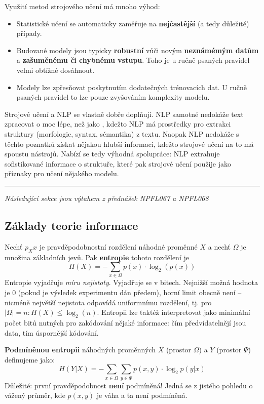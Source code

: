 \documentclass[11pt]{report} %
\numberwithin{equation}{section}
\begin{document}
Využití metod strojového učení má mnoho výhod:
\begin{itemize}
	
	
	\item Statistické učení se automaticky zaměřuje na \textbf{nejčastější} (a tedy důležité) případy.
	\item Budované modely jsou typicky \textbf{robustní} vůči novým \textbf{neznámémým datům} a \textbf{zašuměnému či chybnému vstupu}. Toho je u ručně psaných pravidel velmi obtížné dosáhnout.
	\item Modely lze zpřesňovat poskytnutím dodatečných trénovacích dat. U ručně psaných pravidel to lze pouze zvyšováním komplexity modelu.
\end{itemize}

Strojové učení a NLP se vlastně dobře doplňují. NLP samotné nedokáže text zpracovat o moc lépe, než jako , kdežto NLP má prostředky pro extrakci struktury (morfologie, syntax, sémantika) z textu. Naopak NLP nedokáže s těchto poznatků získat nějakou hlubší informaci, kdežto strojové učení na to má spoustu nástrojů. Nabízí se tedy výhodná spolupráce: NLP extrahuje sofistikované informace o struktuře, které pak strojové učení použije jako příznaky pro učení nějakého modelu.

\hrule
\medskip
\textit{Následující sekce jsou výtahem z přednášek NPFL067 a NPFL068}
\subsection{Základy teorie informace}
Nechť $p_X{x}$ je pravděpodobnostní rozdělení náhodné proměnné $X$ a nechť $\Omega$ je množina základních jevů. Pak \textbf{entropie} tohoto rozdělení je 
$$H(X) = -\sum\limits_{x \in \Omega} p(x) \cdot \log_2(p(x))$$
Entropie vyjadřuje \textit{míru nejistoty}. Vyjadřuje se v bitech. Nejnižší možná hodnota je 0 (pokud je výsledek experimentu dán předem), horní limit obecně není -- nicméně největší nejistota odpovídá uniformnímu rozdělení, tj. pro $|\Omega| = n : H(X) \leq \log_2 (n)$. Entropii lze taktéž interpretovat jako minimální počet bitů nutných pro zakódování nějaké informace: čím předvídatelnějí jsou data, tím úspornější kódování.

\textbf{Podmíněnou entropii} náhodných proměnných $X$ (prostor $\Omega$) a $Y$ (prostor $\Psi$) definujeme jako:
$$H(Y|X) = -\sum\limits_{x \in \Omega} \sum\limits_{y \in \Psi} p(x,y) \cdot \log_2 p(y|x)$$ 
Důležité: první pravděpodobnost \textbf{není} podmíněná! Jedná se z jistého pohledu o vážený průměr, kde $p(x,y)$ je váha a ta není podmíněná.
\end{document}
